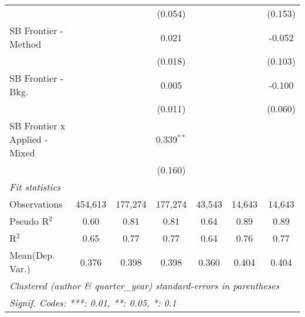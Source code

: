 \begin{tabular}{lcccccc}
                                 &                &                & (0.054)        &                &                & (0.153)\\   
   SB Frontier - Method          &                &                & 0.021          &                &                & -0.052\\   
                                 &                &                & (0.018)        &                &                & (0.103)\\   
   SB Frontier - Bkg.            &                &                & 0.005          &                &                & -0.100\\   
                                 &                &                & (0.011)        &                &                & (0.060)\\   
   SB Frontier x Applied - Mixed &                &                & 0.339$^{**}$   &                &                &   \\   
                                 &                &                & (0.160)        &                &                &   \\   
   \midrule
   \emph{Fit statistics}\\
   Observations                  & 454,613        & 177,274        & 177,274        & 43,543         & 14,643         & 14,643\\  
   Pseudo R$^2$                  & 0.60           & 0.81           & 0.81           & 0.64           & 0.89           & 0.89\\  
   R$^2$                         & 0.65           & 0.77           & 0.77           & 0.64           & 0.76           & 0.77\\  
Mean(Dep. Var.) & 0.376 & 0.398 & 0.398 & 0.360 & 0.404 & 0.404 \\
   \midrule \midrule
   \multicolumn{7}{l}{\emph{Clustered (author \& quarter\_year) standard-errors in parentheses}}\\
   \multicolumn{7}{l}{\emph{Signif. Codes: ***: 0.01, **: 0.05, *: 0.1}}\\
\end{tabular}
\par\endgroup
